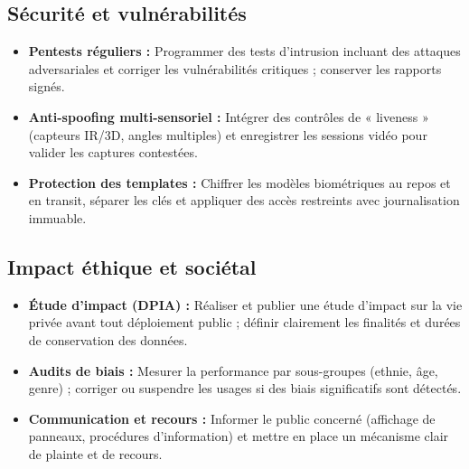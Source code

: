 \documentclass[11pt,a4paper]{article}
\begin{document}
	\subsection{Sécurité et vulnérabilités}
	\begin{itemize}
		\item \textbf{Pentests réguliers :} Programmer des tests d’intrusion incluant des attaques adversariales et corriger les vulnérabilités critiques ; conserver les rapports signés.
		\item \textbf{Anti-spoofing multi-sensoriel :} Intégrer des contrôles de « liveness » (capteurs IR/3D, angles multiples) et enregistrer les sessions vidéo pour valider les captures contestées.
		\item \textbf{Protection des templates :} Chiffrer les modèles biométriques au repos et en transit, séparer les clés et appliquer des accès restreints avec journalisation immuable.
	\end{itemize}
	\vspace{0.5cm}
	\subsection{Impact éthique et sociétal}
	\begin{itemize}
		\item \textbf{Étude d’impact (DPIA) :} Réaliser et publier une étude d’impact sur la vie privée avant tout déploiement public ; définir clairement les finalités et durées de conservation des données.
		\item \textbf{Audits de biais :} Mesurer la performance par sous-groupes (ethnie, âge, genre) ; corriger ou suspendre les usages si des biais significatifs sont détectés.
		\item \textbf{Communication et recours :} Informer le public concerné (affichage de panneaux, procédures d’information) et mettre en place un mécanisme clair de plainte et de recours.
	\end{itemize}
	\vspace{0.5cm}
\end{document}
